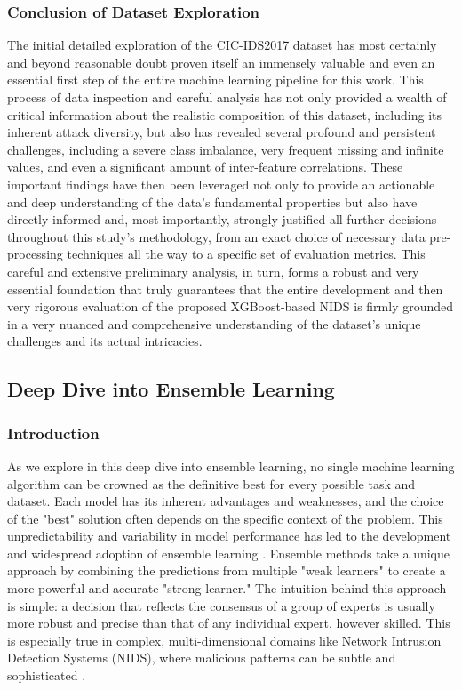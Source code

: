 \subsubsection{Conclusion of Dataset Exploration} 
The initial detailed exploration of the CIC-IDS2017 dataset has most certainly and beyond reasonable doubt proven itself an immensely valuable and even an essential first step of the entire machine learning pipeline for this work. This process of data inspection and careful analysis has not only provided a wealth of critical information about the realistic composition of this dataset, including its inherent attack diversity, but also has revealed several profound and persistent challenges, including a severe class imbalance, very frequent missing and infinite values, and even a significant amount of inter-feature correlations. These important findings have then been leveraged not only to provide an actionable and deep understanding of the data's fundamental properties but also have directly informed and, most importantly, strongly justified all further decisions throughout this study's methodology, from an exact choice of necessary data pre-processing techniques all the way to a specific set of evaluation metrics. This careful and extensive preliminary analysis, in turn, forms a robust and very essential foundation that truly guarantees that the entire development and then very rigorous evaluation of the proposed XGBoost-based NIDS is firmly grounded in a very nuanced and comprehensive understanding of the dataset's unique challenges and its actual intricacies.




\subsection{Deep Dive into Ensemble Learning} 

\subsubsection{Introduction} 
As we explore in this deep dive into ensemble learning, no single machine learning algorithm can be crowned as the definitive best for every possible task and dataset. Each model has its inherent advantages and weaknesses, and the choice of the "best" solution often depends on the specific context of the problem. This unpredictability and variability in model performance has led to the development and widespread adoption of ensemble learning \parencite{al2020survey}. Ensemble methods take a unique approach by combining the predictions from multiple "weak learners" to create a more powerful and accurate "strong learner." The intuition behind this approach is simple: a decision that reflects the consensus of a group of experts is usually more robust and precise than that of any individual expert, however skilled. This is especially true in complex, multi-dimensional domains like Network Intrusion Detection Systems (NIDS), where malicious patterns can be subtle and sophisticated \parencite{aldhubaib2024network}.

